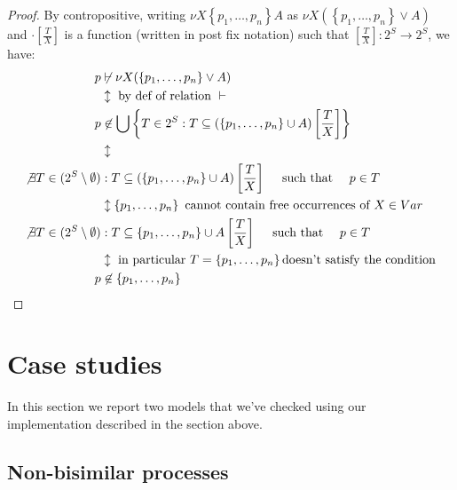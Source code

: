 \begin{proof}
  By contropositive, writing $\nu X \left \lbrace
    p_1,\ldots,p_n\right\rbrace A$ as $\nu X (\left \lbrace
    p_1,\ldots,p_n\right\rbrace \vee A)$ and $\cdot[ \frac{T}{X} ]$ is
  a function (written in post fix notation) such that $[ \frac{T}{X} ]:
  2^S \rightarrow 2^S$, we have:
  \begin{displaymath}
    \begin{split}
      p & \not \vdash \nu X (\left \lbrace p_1,\ldots,p_n\right\rbrace
      \vee A) \\
      & \updownarrow \text{ by def of relation } \vdash  \\
      p & \not \in \bigcup\left\{T \in 2^S: T\subseteq (\left \lbrace
          p_1,\ldots, p_n \right\rbrace \cup A )\left[ \frac{T}{X} \right] \right\}\\
      & \updownarrow \\
      \not \exists T \in (2^S \setminus \emptyset)&:T \subseteq (\left
        \lbrace p_1,\ldots, p_n \right\rbrace \cup A)\left[
        \frac{T}{X} \right] \quad \text{ such that } \quad p \in T \\
      & \updownarrow \left \lbrace p_1,\ldots, p_n \right\rbrace
      \text{ cannot contain free occurrences of } X \in Var  \\
      \not \exists T \in (2^S \setminus \emptyset)&:T \subseteq \left
        \lbrace p_1,\ldots, p_n \right\rbrace \cup A\left[
        \frac{T}{X} \right] \quad \text{ such that } \quad p \in T \\
      & \updownarrow \text{ in particular } T = \left \lbrace
        p_1,\ldots, p_n \right\rbrace \text{doesn't satisfy
        the condition} \\
      p &\not\in \left \lbrace p_1,\ldots, p_n \right\rbrace
    \end{split}
  \end{displaymath}
 
\end{proof}

\section{Case studies}

In this section we report two models that we've checked using our
implementation described in the section above.

\subsection{Non-bisimilar processes}

